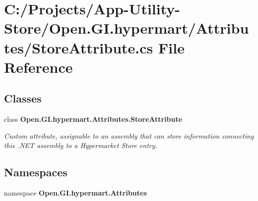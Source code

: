 \section{C\+:/\+Projects/\+App-\/\+Utility-\/\+Store/\+Open.G\+I.\+hypermart/\+Attributes/\+Store\+Attribute.cs File Reference}
\label{_store_attribute_8cs}
\subsection*{Classes}
\begin{DoxyCompactItemize}
\item 
class \textbf{ Open.\+G\+I.\+hypermart.\+Attributes.\+Store\+Attribute}
\begin{DoxyCompactList}\small\item\em Custom attribute, assignable to an assembly that can store information connecting this .N\+ET assembly to a Hypermarket Store entry. \end{DoxyCompactList}\end{DoxyCompactItemize}
\subsection*{Namespaces}
\begin{DoxyCompactItemize}
\item 
namespace \textbf{ Open.\+G\+I.\+hypermart.\+Attributes}
\end{DoxyCompactItemize}
